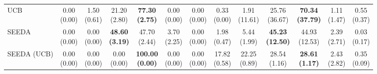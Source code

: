 \begin{table}[H]
{\begin{tabular}{l|cccccc|cccccc}
UCB & \makecell{0.00 \\ (0.00)} & \makecell{1.50 \\ (0.61)} & {\cellcolor[HTML]{C8E6C9}} \makecell{21.20 \\ (2.80)} & \bfseries \makecell{77.30 \\ (2.75)} & \makecell{0.00 \\ (0.00)} & \makecell{0.00 \\ (0.00)} & \makecell{0.33 \\ (0.00)} & \makecell{1.91 \\ (11.61)} & {\cellcolor[HTML]{C8E6C9}} \makecell{25.76 \\ (36.67)} & \bfseries \makecell{70.34 \\ (37.79)} & \makecell{1.11 \\ (1.47)} & \makecell{0.55 \\ (0.37)} \\
SEEDA & \makecell{0.00 \\ (0.00)} & \makecell{0.00 \\ (0.00)} & {\cellcolor[HTML]{C8E6C9}} \bfseries \makecell{48.60 \\ (3.19)} & \makecell{47.70 \\ (2.44)} & \makecell{3.70 \\ (2.25)} & \makecell{0.00 \\ (0.00)} & \makecell{1.98 \\ (0.47)} & \makecell{5.44 \\ (1.99)} & {\cellcolor[HTML]{C8E6C9}} \bfseries \makecell{45.23 \\ (12.50)} & \makecell{44.93 \\ (12.53)} & \makecell{2.39 \\ (2.71)} & \makecell{0.03 \\ (0.17)} \\
SEEDA (UCB) & \makecell{0.00 \\ (0.00)} & \makecell{0.00 \\ (0.00)} & {\cellcolor[HTML]{C8E6C9}} \makecell{0.00 \\ (0.00)} & \bfseries \makecell{100.00 \\ (0.00)} & \makecell{0.00 \\ (0.00)} & \makecell{0.00 \\ (0.00)} & \makecell{17.82 \\ (0.58)} & \makecell{22.25 \\ (0.89)} & {\cellcolor[HTML]{C8E6C9}} \makecell{28.54 \\ (1.16)} & \bfseries \makecell{28.61 \\ (1.17)} & \makecell{2.43 \\ (2.82)} & \makecell{0.35 \\ (0.09)} \\

\end{tabular}}
\end{table}
